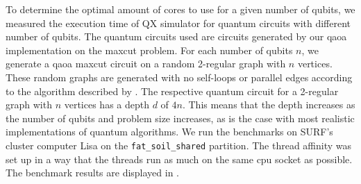 To determine the optimal amount of cores to use for a given number of qubits, we measured the execution time of QX simulator for quantum circuits with different number of qubits.
The quantum circuits used are circuits generated by our \gls{qaoa} implementation on the \gls{maxcut} problem.
For each number of qubits $n$, we generate a \gls{qaoa} \gls{maxcut} circuit on a random 2-regular graph with $n$ vertices.
These random graphs are generated with no self-loops or parallel edges according to the algorithm described by \textcite{steger1999generating}.
The respective quantum circuit for a 2-regular graph with $n$ vertices has a depth $d$ of $4n$.
This means that the depth increases as the number of qubits and problem size increases, as is the case with most realistic implementations of quantum algorithms.
We run the benchmarks on SURF's cluster computer Lisa on the \texttt{fat_soil_shared} partition.
The thread affinity was set up in a way that the threads run as much on the same \gls{cpu} socket as possible.
The benchmark results are displayed in .


